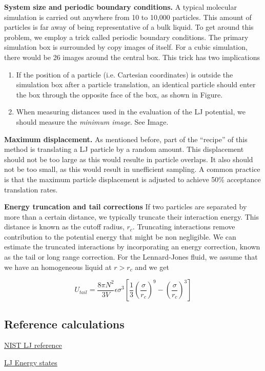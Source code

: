 \documentclass[aip,jcp,preprint,superscriptaddress,floatfix]{revtex4-1}
\begin{document}
\textbf{System size and periodic boundary conditions.} A typical molecular 
simulation is carried out anywhere from 
10 to 10,000 particles. This amount of particles is far away of being
representative of a bulk liquid. To get around this problem, we employ a trick
called
periodic boundary conditions. The primary simulation box is surrounded
by copy images of itself. For a cubic simulation, there would be 26 
images around the central box. This trick has two implications
\begin{enumerate}
	\item If the position of a particle (i.e. Cartesian coordinates) is
		outside the simulation box after a particle translation, 
		an identical particle should enter the box through the
		opposite face of the box, as shown in Figure.
	\item When measuring distances used in the evaluation of the LJ
		potential, we should measure the \textit{minimum
		image}. See Image.
\end{enumerate}

\textbf{Maximum displacement.} As mentioned before, part of the ``recipe''
of this method is translating a LJ particle by a random amount. This
displacement should not be too large as this would resulte in particle overlaps. It also should not be too small, as this would result in unefficient sampling.
A common practice is that the maximum particle displacement is adjusted
to achieve 50\% acceptance translation rates. 

\textbf{Energy truncation and tail corrections} If two particles are separated
by more than a certain distance, we typically truncate their interaction energy.
 This distance is known as the cutoff radius, $r_c$. Truncating interactions
remove contribution to the potential energy that might be non negligible. 
We can estimate the truncated interactions by incorporating an energy 
correction, known as the tail or long range correction.
For the Lennard-Jones fluid, we assume that we have an homogeneous liquid
at $r>r_c$ and we get

\begin{equation}
	U_{tail} = \frac{8 \pi N^2}{3 V} \epsilon \sigma^3
	\left[\frac{1}{3} \left(\frac{\sigma}{r_c} \right)^9 
	- \left(\frac{\sigma}{r_c} \right)^3 \right]
\end{equation}


\subsection{Reference calculations}

\href{https://mmlapps.nist.gov/srs/LJ_PURE/mc.htm}{NIST LJ reference}

\href{https://www.nist.gov/mml/csd/chemical-informatics-research-group/lennard-jones-fluid-reference-calculations}{LJ Energy states}

\newpage
%
%
%
\end{document}
